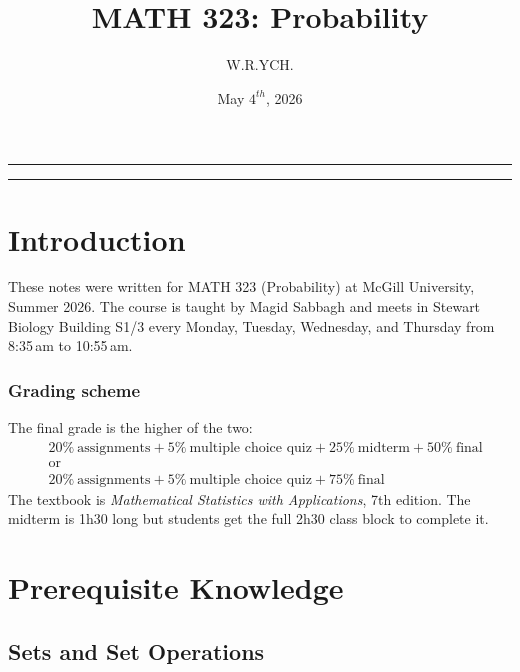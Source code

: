 \documentclass{article}
\begin{document}
\title{MATH 323: Probability}
\author{W.R.YCH.}
\date{May $4^{th}$, 2026}
\setcounter{Maxaffil}{0}
\renewcommand\Affilfont{\itshape\small}
\maketitle

\noindent\rule{\textwidth}{0.4pt}
\thispagestyle{empty}
\begin{abstract}
\end{abstract}
\noindent\rule{\textwidth}{0.4pt}
\clearpage

\thispagestyle{empty}
{
  \hypersetup{linkcolor=black}
  \tableofcontents
}
\clearpage

\setcounter{page}{1}
\section{Introduction}
These notes were written for MATH 323 (Probability) at McGill University, Summer 2026. The course is taught by Magid Sabbagh and meets in Stewart Biology Building S1/3 every Monday, Tuesday, Wednesday, and Thursday from 8:35\,am to 10:55\,am.

\subsubsection*{Grading scheme}
The final grade is the higher of the two:
\begin{align}
    &20\%\ \text{assignments} + 5\%\ \text{multiple choice quiz} + 25\%\ \text{midterm} + 50\%\ \text{final}\\
    &\text{or}\\
    &20\%\ \text{assignments} + 5\%\ \text{multiple choice quiz} + 75\%\ \text{final}
\end{align}
The textbook is \textit{Mathematical Statistics with Applications}, 7th edition. The midterm is 1h30 long but students get the full 2h30 class block to complete it.

\section{Prerequisite Knowledge}

\subsection{Sets and Set Operations}
\end{document}
